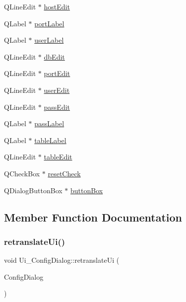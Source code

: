 \begin{DoxyCompactItemize}
Q\+Line\+Edit $\ast$ \hyperlink{class_ui___config_dialog_a6ff1b46fdccc680c12993e26b9579bd1}{host\+Edit}
\item 
Q\+Label $\ast$ \hyperlink{class_ui___config_dialog_aace381dafa758ec7e27733645d41eca9}{port\+Label}
\item 
Q\+Label $\ast$ \hyperlink{class_ui___config_dialog_abbef204eacdb977d32dd42e5a066f6d6}{user\+Label}
\item 
Q\+Line\+Edit $\ast$ \hyperlink{class_ui___config_dialog_a919a125c3720a412c20a99f484b4502f}{db\+Edit}
\item 
Q\+Line\+Edit $\ast$ \hyperlink{class_ui___config_dialog_ae462b531571caa0598694795b1bf3979}{port\+Edit}
\item 
Q\+Line\+Edit $\ast$ \hyperlink{class_ui___config_dialog_a692ff452b0cad85f4bb572553448b650}{user\+Edit}
\item 
Q\+Line\+Edit $\ast$ \hyperlink{class_ui___config_dialog_ac11b6a4e7bbc0036ad1e44d8613468e9}{pass\+Edit}
\item 
Q\+Label $\ast$ \hyperlink{class_ui___config_dialog_aec1108602498e792d3ecbae20e890aa2}{pass\+Label}
\item 
Q\+Label $\ast$ \hyperlink{class_ui___config_dialog_ab6e04543314a4b4063bc0851adbe2918}{table\+Label}
\item 
Q\+Line\+Edit $\ast$ \hyperlink{class_ui___config_dialog_ad451ab8bf41d5cae22b2338987649c12}{table\+Edit}
\item 
Q\+Check\+Box $\ast$ \hyperlink{class_ui___config_dialog_ab684209987ed4108ea8974159ff2f5a8}{reset\+Check}
\item 
Q\+Dialog\+Button\+Box $\ast$ \hyperlink{class_ui___config_dialog_a35f90058a76519163267d4bdbf464306}{button\+Box}
\end{DoxyCompactItemize}


\subsection{Member Function Documentation}
\mbox{\label{class_ui___config_dialog_ab60d649af45498dee23f4e61fcfe94d8}} 
\subsubsection{\texorpdfstring{retranslate\+Ui()}{retranslateUi()}}
{\footnotesize\ttfamily void Ui\+\_\+\+Config\+Dialog\+::retranslate\+Ui (\begin{DoxyParamCaption}\item[{Q\+Dialog $\ast$}]{Config\+Dialog }\end{DoxyParamCaption})\hspace{0.3cm}{\ttfamily [inline]}}

